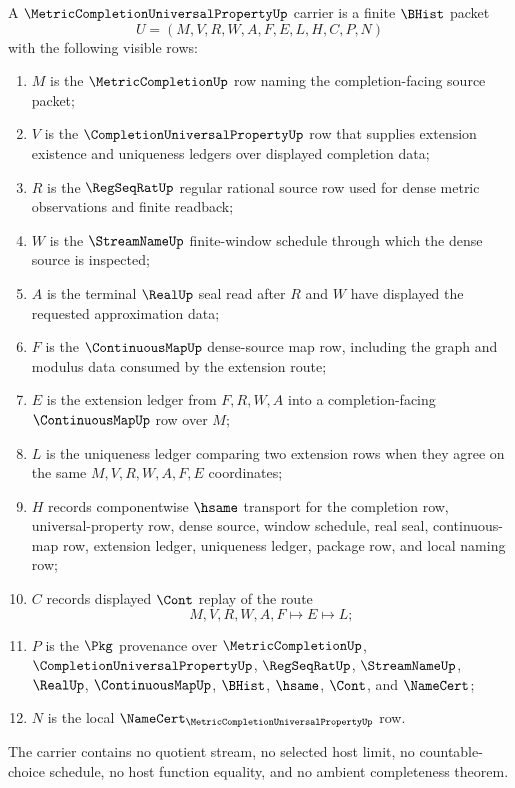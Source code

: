 \begin{definition}
\label{def:metric-completion-universal-property-carrier}
A $\MetricCompletionUniversalPropertyUp$ carrier is a finite $\BHist$ packet
$$
U=(M,V,R,W,A,F,E,L,H,C,P,N)
$$
with the following visible rows:
\begin{enumerate}
\item $M$ is the $\MetricCompletionUp$ row naming the completion-facing source packet;
\item $V$ is the $\CompletionUniversalPropertyUp$ row that supplies extension existence and uniqueness ledgers over displayed completion data;
\item $R$ is the $\RegSeqRatUp$ regular rational source row used for dense metric observations and finite readback;
\item $W$ is the $\StreamNameUp$ finite-window schedule through which the dense source is inspected;
\item $A$ is the terminal $\RealUp$ seal read after $R$ and $W$ have displayed the requested approximation data;
\item $F$ is the $\ContinuousMapUp$ dense-source map row, including the graph and modulus data consumed by the extension route;
\item $E$ is the extension ledger from $F,R,W,A$ into a completion-facing $\ContinuousMapUp$ row over $M$;
\item $L$ is the uniqueness ledger comparing two extension rows when they agree on the same $M,V,R,W,A,F,E$ coordinates;
\item $H$ records componentwise $\hsame$ transport for the completion row, universal-property row, dense source, window schedule, real seal, continuous-map row, extension ledger, uniqueness ledger, package row, and local naming row;
\item $C$ records displayed $\Cont$ replay of the route
$$
M,V,R,W,A,F\longmapsto E\longmapsto L ;
$$
\item $P$ is the $\Pkg$ provenance over $\MetricCompletionUp$, $\CompletionUniversalPropertyUp$, $\RegSeqRatUp$, $\StreamNameUp$, $\RealUp$, $\ContinuousMapUp$, $\BHist$, $\hsame$, $\Cont$, and $\NameCert$;
\item $N$ is the local $\NameCert_{\MetricCompletionUniversalPropertyUp}$ row.
\end{enumerate}
The carrier contains no quotient stream, no selected host limit, no countable-choice schedule, no host function equality, and no ambient completeness theorem.
\end{definition}

